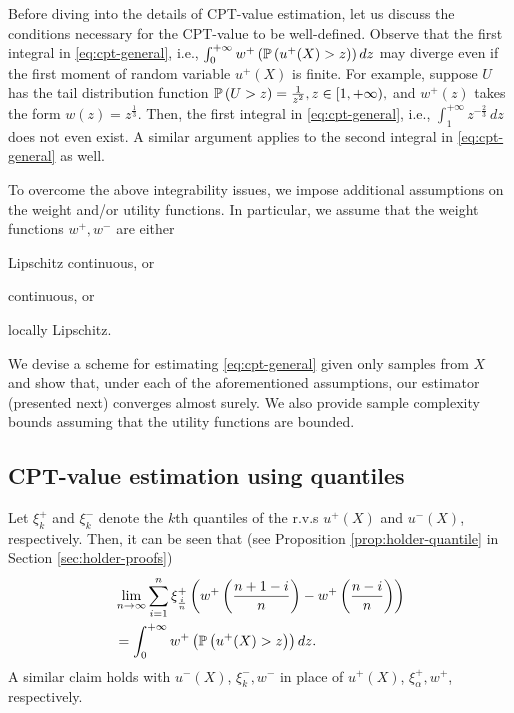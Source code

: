 
Before diving into the details of CPT-value estimation, let us discuss the conditions necessary for the CPT-value to be well-defined.
Observe that the first integral in \eqref{eq:cpt-general}, i.e., 
$\int_0^{+\infty} w^+\left(\mathbb{P}\left( u^+(X)>z \right)\right) d z$
may diverge even if the first moment of random variable $u^+(X)$ is finite. 
For example, suppose $U$ has the tail distribution function
$\mathbb{P}\left( U>z \right)  = \frac{1}{z^2}, z\in [1, +\infty),$
 and $w^+(z)$ takes the form $w(z) = z^{\frac{1}{3}}$. Then, the first integral in \eqref{eq:cpt-general}, i.e.,
$
\int_1^{+\infty}  z^{-\frac{2}{3}}\, dz
$
does not even exist. A similar argument applies to the second integral in \eqref{eq:cpt-general} as well.

To overcome the above integrability issues, we impose additional  assumptions on the weight and/or utility functions. In particular, we assume that the weight functions $w^+, w^-$ are either 
\begin{inparaenum}[\it (i)]
\item Lipschitz continuous, or
\item \holder continuous, or
\item locally Lipschitz.
\end{inparaenum}
We devise a scheme for estimating \eqref{eq:cpt-general} given only samples from $X$ and show that, under each of the aforementioned assumptions, our estimator (presented next) converges almost surely. 
We also provide sample complexity bounds assuming that the utility functions are bounded.

\subsection{CPT-value estimation using quantiles}
Let $\xi^+_{k}$ and $\xi^-_{k}$ denote the $k$th quantiles of the r.v.s $u^+(X)$ and $u^-(X)$, respectively. 
Then, it can be seen that (see Proposition \ref{prop:holder-quantile} in Section \ref{sec:holder-proofs})
\begin{align}
&\lim_{n \rightarrow \infty} \sum_{i=1}^{n} \xi^+_{\frac{i}{n}} \left(w^+\left(\frac{n+1-i}{n}\right)- w^+\left(\frac{n-i}{n}\right) \right) \nonumber\\
&= \int_0^{+\infty} w^+\left(\mathbb{P}\left( u^+(X)>z \right)\right) dz.\label{eq:holder-quant-motiv}
\end{align}
A similar claim holds with $u^-(X)$, $\xi^-_{k}, w^-$ in place of  $u^+(X)$, $\xi^+_{\alpha}, w^+$, respectively. 

